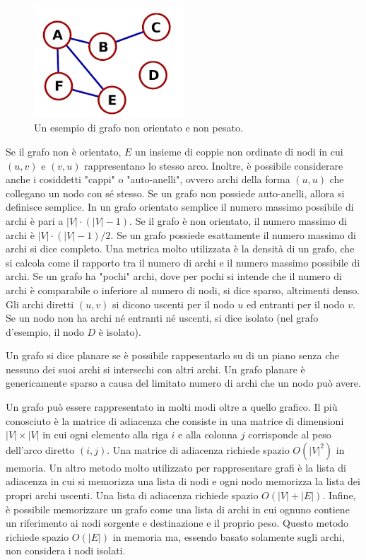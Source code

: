\documentclass[12pt,a4paper,oneside]{book}
\begin{document}
	\begin{figure}
		\centering
		\includegraphics[width=0.5\textwidth]{grafo-esempio}
		\caption{Un esempio di grafo non orientato e non pesato.}
		\label{fig:grafo-esempio}
	\end{figure}

	Se il grafo non è orientato, $E$ un insieme di coppie non ordinate di nodi in cui $(u,v)$ e $(v,u)$ rappresentano lo stesso arco.	Inoltre, è possibile considerare anche i cosiddetti "cappi" o "auto-anelli", ovvero archi della forma $(u,u)$ che collegano un nodo con sé stesso. Se un grafo non possiede auto-anelli, allora si definisce semplice. In un grafo orientato semplice il numero massimo possibile di archi è pari a $|V|\cdot(|V|-1)$. Se il grafo è non orientato, il numero massimo di archi è $|V|\cdot(|V|-1)/2$. Se un grafo possiede esattamente il numero massimo di archi si dice completo. Una metrica molto utilizzata è la densità di un grafo, che si calcola come il rapporto tra il numero di archi e il numero massimo possibile di archi. Se un grafo ha "pochi" archi, dove per pochi si intende che il numero di archi è comparabile o inferiore al numero di nodi, si dice sparso, altrimenti denso. Gli archi diretti $(u,v)$ si dicono uscenti per il nodo $u$ ed entranti per il nodo $v$. Se un nodo non ha archi né entranti né uscenti, si dice isolato (nel grafo d'esempio, il nodo $D$ è isolato).
	
	Un grafo si dice planare se è possibile rappesentarlo su di un piano senza che nessuno dei suoi archi si intersechi con altri archi. Un grafo planare è genericamente sparso a causa del limitato numero di archi che un nodo può avere.
	
	Un grafo può essere rappresentato in molti modi oltre a quello grafico. Il più conosciuto è la matrice di adiacenza che consiste in una matrice di dimensioni $|V|\times |V|$ in cui ogni elemento alla riga $i$ e alla colonna $j$ corrisponde al peso dell'arco diretto $(i,j)$. Una matrice di adiacenza richiede spazio $O(|V|^2)$ in memoria. Un altro metodo molto utilizzato per rappresentare grafi è la lista di adiacenza in cui si memorizza una lista di nodi e ogni nodo memorizza la lista dei propri archi uscenti. Una lista di adiacenza richiede spazio $O(|V|+|E|)$. Infine, è possibile memorizzare un grafo come una lista di archi in cui ognuno contiene un riferimento ai nodi sorgente e destinazione e il proprio peso. Questo metodo richiede spazio $O(|E|)$ in memoria ma, essendo basato solamente sugli archi, non considera i nodi isolati.
	
\end{document}
